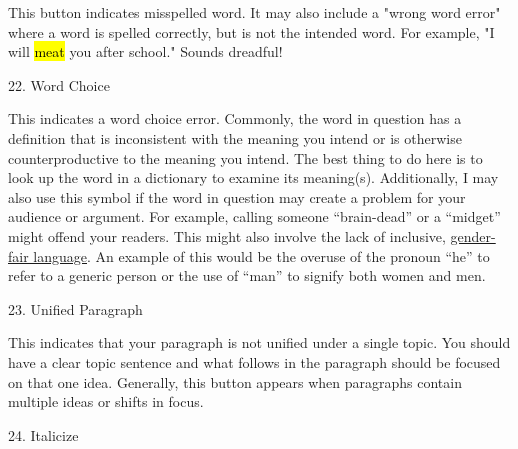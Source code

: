 This button indicates misspelled word. It may also include a "wrong word error"
where a word is spelled correctly, but is not the intended word. For example, "I
will \hl{meat} you after school." Sounds dreadful!

 \begin{center}
\bigskip

{\huge 22. Word Choice} \end{center}

This indicates a word choice error. Commonly, the word in question has a
definition that is inconsistent with the meaning you intend or is otherwise
counterproductive to the meaning you intend. The best thing to do here is to
look up the word in a dictionary to examine its meaning(s). Additionally, I may also use this symbol if the word in question may create a
problem for your audience or argument. For example, calling someone “brain-dead”
or a “midget” might offend your readers. This might also involve the lack of
inclusive, \href{http://www.ncte.org/positions/statements/genderfairuseoflang}{gender-fair language}. An example of this would be the overuse of the
pronoun “he” to refer to a generic person or the use of “man” to signify both
women and men.

 \begin{center}
\bigskip

{\huge 23. Unified Paragraph} \end{center}

This indicates that your paragraph is not unified under a single topic. You
should have a clear topic sentence and what follows in the paragraph should be
focused on that one idea. Generally, this button appears when paragraphs contain
multiple ideas or shifts in focus.

 \begin{center}
\bigskip

{\huge 24. Italicize} \end{center}

